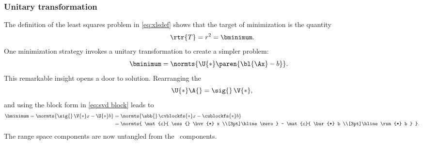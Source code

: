 \subsubsection{Unitary transformation}  %
The definition of the least squares problem in \eqref{eq:xlsdef} shows that the target of minimization is the quantity
\begin{equation*}
  \rtr{T} = r^{2} = \bminimum .
\end{equation*}
One minimization strategy invokes a unitary transformation to create a simpler problem:
\begin{equation}
  \begin{split} 
    \bminimum 
      &= \normts{ \U{*} \paren{ \bl{\Ax} - b }  }.
  \end{split} 
\end{equation}
This remarkable insight opens a door to solution. Rearranging the \asvd 
\begin{equation*}
  \U{*} \A{} = \sig{} \, \V{*},
\end{equation*}
and using the block form in \eqref{eq:svd block} leads to
\begin{equation*}
  \begin{split} 
    \bminimum 
       = \normts{ \sig{} \, \V{*} x - \U{*} b }
      &= \normts{ \sbb{} \, \cvblockfs{*} x - \cublockfs{*} b } \\
	    &= \normts{ \mat{c}{ \ess{} \bvr{*} x \\[3pt]\hline\zero  } - \mat{c}{ \bur{*} b \\[3pt]\hline \run{*} b } }.
  \end{split} 
\end{equation*}
The range space components are now untangled from the  \ns \ components.

